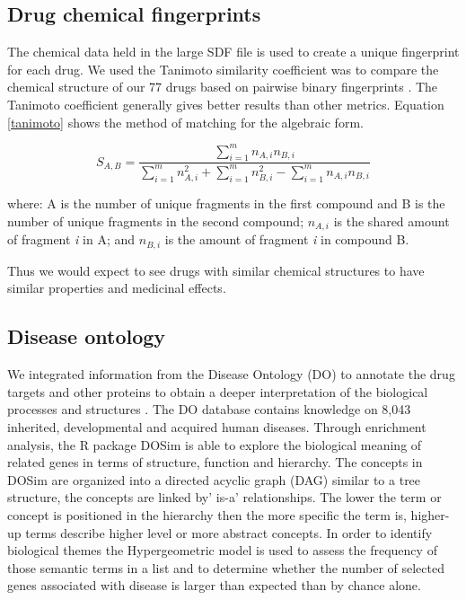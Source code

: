 \documentclass[preprint,12pt]{elsarticle}
\begin{document}
\subsection{Drug chemical fingerprints}
The chemical data held in the large SDF file is used to create a unique fingerprint for each drug. We used the Tanimoto similarity coefficient was to compare the chemical structure of our 77 drugs based on pairwise binary fingerprints \cite{Chen2002}. The Tanimoto coefficient generally gives better results than other metrics. Equation \ref{tanimoto} shows the method of matching for the algebraic form.

\begin{equation}\label{tanimoto}
     S_{A,B}  =  \frac{\sum\limits_{i=1}^m n_{A,i} n_{B,i}}{\sum\limits_{i=1}^m  n_{A,i}^2+ \sum\limits_{i=1}^m n_{B,i}^2 - \sum\limits_{i=1}^m n_{A,i} n_{B,i}}  
\end{equation}

where: A is the number of unique fragments in the first compound and B is the number of unique fragments in the second compound; 
$ n_{A,i} $ is the shared amount of fragment  {\it i} in A; and $ n_{B,i} $ is the amount of fragment {\it i} in compound B.

Thus we would expect to see drugs with similar chemical structures to have similar properties and medicinal effects.

\subsection{Disease ontology}
We integrated information from the Disease Ontology (DO)   to annotate the drug targets and other proteins to obtain a deeper interpretation of the biological processes and structures \cite{Yu2010,Jiang2011,Schriml2012}. The DO database contains knowledge on 8,043 inherited, developmental and acquired human diseases. Through enrichment analysis, the R package  DOSim is able to explore the biological meaning of related genes in terms of structure, function and hierarchy. The concepts in DOSim are organized into a directed acyclic graph (DAG) similar to a tree structure, the concepts are linked by' is-a' relationships. The lower the term or concept is positioned in the hierarchy then the more specific the term is, higher-up terms describe higher level or more abstract concepts. In order to identify biological themes the Hypergeometric model is used to assess the frequency of those semantic terms
in a list and to determine whether the number of selected genes associated with disease is larger than expected than by chance alone.
\end{document}

